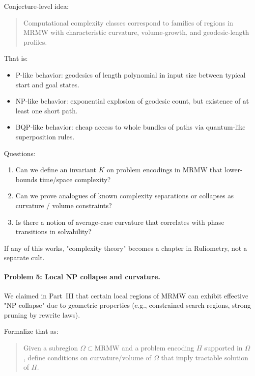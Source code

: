 Conjecture-level idea:

\begin{quote}
Computational complexity classes correspond to families of regions in MRMW with characteristic curvature, volume-growth, and geodesic-length profiles.
\end{quote}

That is:

\begin{itemize}
  \item P-like behavior: geodesics of length polynomial in input size between typical start and goal states.
  \item NP-like behavior: exponential explosion of geodesic count, but existence of at least one short path.
  \item BQP-like behavior: cheap access to whole bundles of paths via quantum-like superposition rules.
\end{itemize}

Questions:

\begin{enumerate}
  \item Can we define an invariant $K$ on problem encodings in MRMW that lower-bounds time/space complexity?
  \item Can we prove analogues of known complexity separations or collapses as curvature / volume constraints?
  \item Is there a notion of average-case curvature that correlates with phase transitions in solvability?
\end{enumerate}

If any of this works, "complexity theory" becomes a chapter in Ruliometry, not a separate cult.

\paragraph{Problem 5: Local NP collapse and curvature.}

We claimed in Part~III that certain local regions of MRMW can exhibit effective "NP collapse" due to geometric properties (e.g., constrained search regions, strong pruning by rewrite laws).

Formalize that as:

\begin{quote}
Given a subregion $\Omega \subset \text{MRMW}$ and a problem encoding $\Pi$ supported in $\Omega$, define conditions on curvature/volume of $\Omega$ that imply tractable solution of $\Pi$.
\end{quote}

